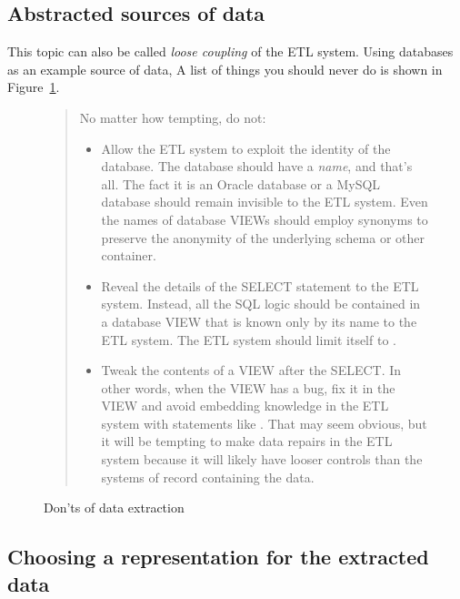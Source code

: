 \documentclass[11pt,letterpaper,twosided]{memoir}
\begin{document}
\subsection{Abstracted sources of data}

This topic can also be called \emph{loose coupling} of the ETL
system. Using databases as an example source of data, A list of 
things you should never do is shown in Figure~\ref{fig:donts}.

\begin{figure}
\begin{framed}
\begin{quote}
No matter how tempting, do not:

\small
\begin{itemize}

\item Allow the ETL system to exploit the identity of the database.
The database should have a \emph{name}, and that's all. The fact it
is an Oracle database or a MySQL database should remain invisible
to the ETL system. Even the names of database VIEWs should employ 
synonyms to preserve the anonymity of the underlying schema or
other container. 

\item Reveal the details of the SELECT statement to the ETL system.
Instead, all the SQL logic should be contained in a database VIEW
that is known only by its name to the ETL system. The ETL system
should limit itself to .

\item Tweak the contents of a VIEW after the SELECT. In other words,
when the VIEW has a bug, fix it in the VIEW and avoid embedding
knowledge in the ETL system with statements like .  That may seem obvious, but
it will be tempting to make data repairs in the ETL system because
it will likely have looser controls than the systems of record
containing the data.

\end{itemize}
\end{quote}
\caption{Don'ts of data extraction}
\label{fig:donts}
\end{framed}
\end{figure}

\subsection{Choosing a representation for the extracted data}
\end{document}
